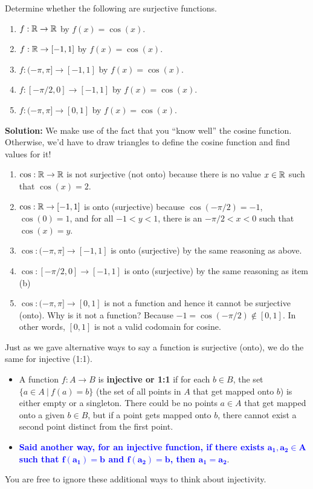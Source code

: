 \begin{example} Determine whether the following are surjective functions.
\begin{enumerate}
\renewcommand{\labelenumi}{(\alph{enumi})}
\setlength{\itemsep}{.2cm}
    \item $f:\mathbb R \to \mathbb R$ by $f(x) = \cos(x)$.
    \item $f:\mathbb R \to [-1, 1]$ by $f(x) = \cos(x)$.
    \item $f:(-\pi, \pi] \to [-1, 1]$ by $f(x) = \cos(x)$.
    \item $f:[-\pi/2, 0] \to [-1, 1]$ by $f(x) = \cos(x)$.
    \item $f:(-\pi, \pi] \to [0, 1]$ by $f(x) = \cos(x)$.
\end{enumerate}    
\end{example}

\textbf{Solution:} We make use of the fact that you ``know well'' the cosine function. Otherwise, we'd have to draw triangles to define the cosine function and find values for it! 

\begin{enumerate}
\renewcommand{\labelenumi}{(\alph{enumi})}
\setlength{\itemsep}{.2cm}
    \item $\cos:\mathbb R \to \mathbb R$ is not surjective (not onto) because there is no value $x\in \mathbb R$ such that $\cos(x) = 2$. 
    \item $\cos:\mathbb R \to [-1, 1]$ is onto (surjective) because $\cos(-\pi/2)=-1$, $\cos(0)=1$, and for all $-1 < y < 1$, there is an $-\pi/2 < x < 0$ such that $\cos(x)=y$.
    \item $\cos:(-\pi, \pi] \to [-1, 1]$ is onto (surjective) by the same reasoning as above.
    \item $\cos:[-\pi/2, 0] \to [-1, 1]$  is onto (surjective) by the same reasoning as item (b)
    \item $\cos:(-\pi, \pi] \to [0, 1]$ is not a function and hence it cannot be surjective (onto). Why is it not a function? Because $-1 = \cos(-\pi/2) \not \in [0, 1]$. In other words, $[0, 1]$ is not a valid codomain for cosine. 
\end{enumerate}    

\Qed
\bigskip

Just as we gave alternative ways to say a function is surjective (onto), we do the same for injective (1:1).
\begin{itemize}
    \item A function $f:A \to B$ is \textbf{injective or 1:1} if for each $b\in B$, the set $\{ a\in A~ | ~ f(a) = b\}$ (the set of all points in $A$ that get mapped onto $b$) is either empty or a singleton. There could be no points $a\in A$ that get mapped onto a given $b\in B$, but if a point gets mapped onto $b$, there cannot exist a second point distinct from the first point. 
    \item \textcolor{blue}{\bf Said another way, for an injective function, if there exists $\bm{a_1, a_2\in A}$ such that $\bm{f(a_1) = b}$ and $\bm{f(a_2)=b}$, then $\bm{a_1=a_2}$}. 
\end{itemize}
You are free to ignore these additional ways to think about injectivity.  

